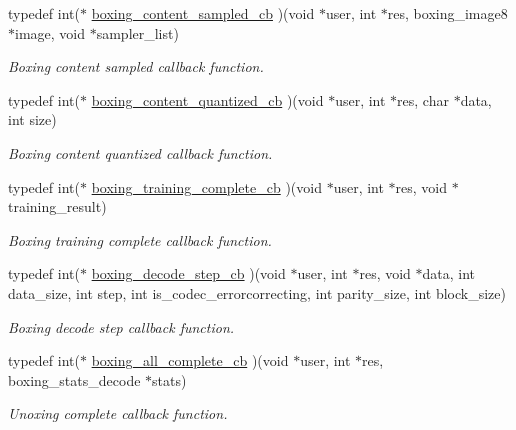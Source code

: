 \begin{DoxyCompactItemize}
typedef int($\ast$ \hyperlink{group__unboxer_gade5396bcb001d9594974e76edcd22343}{boxing\_\-content\_\-sampled\_\-cb} )(void $\ast$user, int $\ast$res, boxing\_\-image8 $\ast$image, void $\ast$sampler\_\-list)
\begin{DoxyCompactList}\small\item\em Boxing content sampled callback function. \item\end{DoxyCompactList}\item 
typedef int($\ast$ \hyperlink{group__unboxer_ga200ab55a4d8302d501a8964ec5941e10}{boxing\_\-content\_\-quantized\_\-cb} )(void $\ast$user, int $\ast$res, char $\ast$data, int size)
\begin{DoxyCompactList}\small\item\em Boxing content quantized callback function. \item\end{DoxyCompactList}\item 
typedef int($\ast$ \hyperlink{group__unboxer_gaaafcc2fdb11841b10ab6adb26b06eb09}{boxing\_\-training\_\-complete\_\-cb} )(void $\ast$user, int $\ast$res, void $\ast$training\_\-result)
\begin{DoxyCompactList}\small\item\em Boxing training complete callback function. \item\end{DoxyCompactList}\item 
typedef int($\ast$ \hyperlink{group__unboxer_gaa152af7889b62277c3cd7dae89fd94a6}{boxing\_\-decode\_\-step\_\-cb} )(void $\ast$user, int $\ast$res, void $\ast$data, int data\_\-size, int step, int is\_\-codec\_\-errorcorrecting, int parity\_\-size, int block\_\-size)
\begin{DoxyCompactList}\small\item\em Boxing decode step callback function. \item\end{DoxyCompactList}\item 
typedef int($\ast$ \hyperlink{group__unboxer_ga26d1d88b45ca8c86a13af64e4dd4830b}{boxing\_\-all\_\-complete\_\-cb} )(void $\ast$user, int $\ast$res, boxing\_\-stats\_\-decode $\ast$stats)
\begin{DoxyCompactList}\small\item\em Unoxing complete callback function. \item\end{DoxyCompactList}\end{DoxyCompactItemize}

